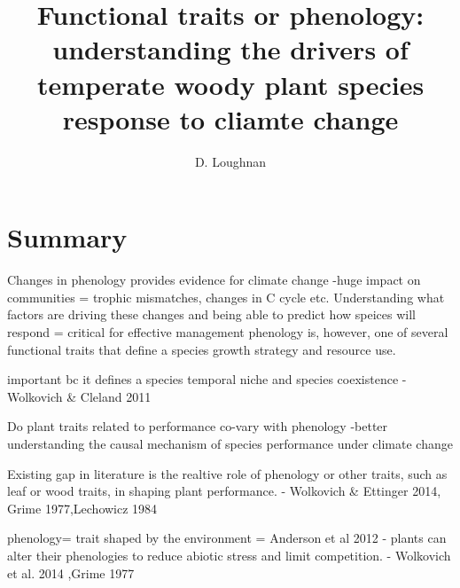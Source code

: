 \documentclass{article}\usepackage[]{graphicx}\usepackage[]{color}
\begin{document}
 
\title{Functional traits or phenology: understanding the drivers of temperate woody plant species response to cliamte change} %

\author{D. Loughnan}
\maketitle  %


\section*{Summary}


Changes in phenology provides evidence for climate change
-huge impact on communities = trophic mismatches, changes in C cycle etc.
Understanding what factors are driving these changes and being able to predict how speices will respond = critical for effective management
phenology is, however, one of several functional traits that define a species growth strategy and resource use.

important bc it defines a species temporal niche and species coexistence - Wolkovich & Cleland 2011

Do plant traits related to performance co-vary with phenology
-better understanding the causal mechanism of species performance under climate change

Existing gap in literature is the realtive role of phenology or other traits, such as leaf or wood traits, in shaping plant performance. - Wolkovich & Ettinger 2014, Grime 1977,Lechowicz 1984

phenology= trait shaped by the environment =  Anderson et al 2012
- plants can alter their phenologies to reduce abiotic stress and limit competition. - Wolkovich et al. 2014 ,Grime 1977
\end{document}
